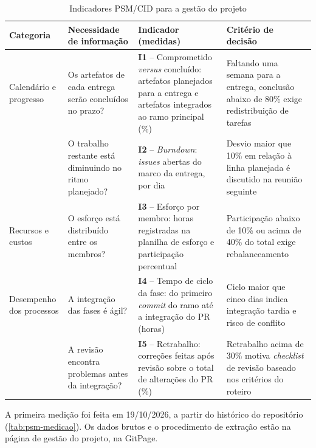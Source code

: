 \begin{table}[htb]
	\caption{Indicadores PSM/CID para a gestão do projeto}
	\label{tab:psm}
	\centering
	\scriptsize
	\begin{tabularx}{\textwidth}{L{1.9cm} L{3.2cm} L{3.6cm} Y}
		\toprule
		\textbf{Categoria} & \textbf{Necessidade de informação} & \textbf{Indicador (medidas)} & \textbf{Critério de decisão} \\
		\midrule
		Calendário e progresso & Os artefatos de cada entrega serão concluídos no prazo? & \textbf{I1} -- Comprometido \textit{versus} concluído: artefatos planejados para a entrega e artefatos integrados ao ramo principal (\%) & Faltando uma semana para a entrega, conclusão abaixo de 80\% exige redistribuição de tarefas \\
		& O trabalho restante está diminuindo no ritmo planejado? & \textbf{I2} -- \textit{Burndown}: \textit{issues} abertas do marco da entrega, por dia & Desvio maior que 10\% em relação à linha planejada é discutido na reunião seguinte \\
		Recursos e custos & O esforço está distribuído entre os membros? & \textbf{I3} -- Esforço por membro: horas registradas na planilha de esforço e participação percentual & Participação abaixo de 10\% ou acima de 40\% do total exige rebalanceamento \\
		Desempenho dos processos & A integração das fases é ágil? & \textbf{I4} -- Tempo de ciclo da fase: do primeiro \textit{commit} do ramo até a integração do PR (horas) & Ciclo maior que cinco dias indica integração tardia e risco de conflito \\
		& A revisão encontra problemas antes da integração? & \textbf{I5} -- Retrabalho: correções feitas após revisão sobre o total de alterações do PR (\%) & Retrabalho acima de 30\% motiva \textit{checklist} de revisão baseado nos critérios do roteiro \\
		\bottomrule
	\end{tabularx}
\end{table}

A primeira medição foi feita em 19/10/2026, a partir do histórico do repositório (\autoref{tab:psm-medicao}). Os dados brutos e o procedimento de extração estão na página de gestão do projeto, na GitPage.

